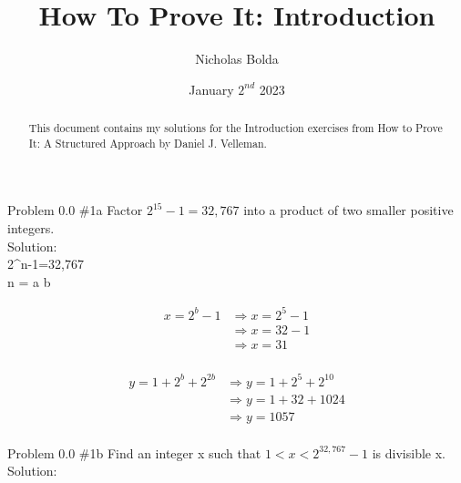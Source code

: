 \documentclass[12pt]{article}
\title{How To Prove It: Introduction}
\author{Nicholas Bolda}
\date{January \(2^{nd}\) 2023}
\begin{document}
\markboth{\theauthor}{\thetitle}

\maketitle

\begin{abstract}
    This document contains my solutions for the Introduction exercises from How to Prove It: A Structured Approach by Daniel J. Velleman.
\end{abstract}


\begin{problem}{Problem 0.0 \#1a}
    Factor \(2^{15} - 1=32,767\) into a product of two smaller positive integers. \\
    
    Solution: \\
        2^n-1=32,767 \\
        n = a \cdot b 
        
    \begin{align}
        x = 2^b-1 
            &\Rightarrow x = 2^5-1 \\
            &\Rightarrow x = 32 - 1\\
            &\Rightarrow x = 31\\
    \end{align}

    \begin{align}
        y = 1+2^b+2^{2b}
            &\Rightarrow y = 1+2^5+2^{10}\\
            &\Rightarrow y = 1+32+1024\\
            &\Rightarrow y = 1057\\
    \end{align}
        
\end{problem}

\begin{problem}{Problem 0.0 \#1b}
    Find an integer x such that \(1 < x < 2^{32,767}-1\) is divisible x. \\

    Solution:
    
\end{problem}
\end{document}

